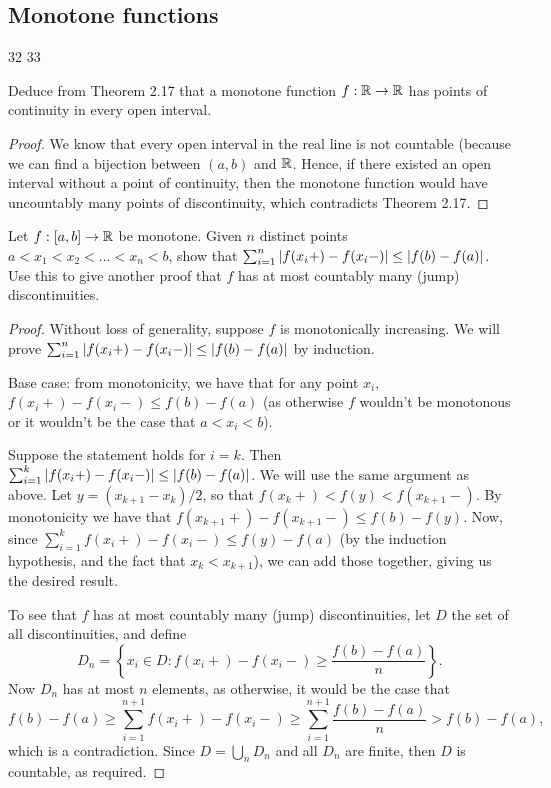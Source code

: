 \subsection{Monotone functions}

32
33

\begin{exercise}{32}
Deduce from Theorem 2.17 that a monotone function $f:\mathbb{R}\to\mathbb{R}$ has points of continuity in every open interval.
\end{exercise}
\begin{proof}
We know that every open interval in the real line is not countable (because we can find a bijection between $(a,b)$ and $\mathbb{R}$. Hence, if there existed an open interval without a point of continuity, then the monotone function would have uncountably many points of discontinuity, which contradicts Theorem 2.17.
\end{proof} 

\begin{exercise}{33}
Let $f:[a,b]\to\mathbb{R}$ be monotone. Given $n$ distinct points $a<x_1<x_2<\dots<x_n<b$, show that $\sum_{i=1}^n\left\lvert f(x_i+)-f(x_i-)\right\rvert\leq \left\lvert f(b)-f(a)\right\rvert$. Use this to give another proof that $f$ has at most countably many (jump) discontinuities.
\end{exercise}
\begin{proof}
Without loss of generality, suppose $f$ is monotonically increasing. We will prove $\sum_{i=1}^n\left\lvert f(x_i+)-f(x_i-)\right\rvert\leq \left\lvert f(b)-f(a)\right\rvert$ by induction.

Base case: from monotonicity, we have that for any point $x_i$, $f(x_i+)-f(x_i-)\leq f(b)-f(a)$ (as otherwise $f$ wouldn't be monotonous or it wouldn't be the case that $a<x_i<b$).

Suppose the statement holds for $i=k$. Then $\sum_{i=1}^k\left\lvert f(x_i+)-f(x_i-)\right\rvert\leq \left\lvert f(b)-f(a)\right\rvert$. We will use the same argument as above. Let $y=(x_{k+1}-x_k)/2$, so that $f(x_k+)<f(y)<f(x_{k+1}-)$. By monotonicity we have that $f(x_{k+1}+)-f(x_{k+1}-)\leq f(b)-f(y)$. Now, since $\sum_{i=1}^k f(x_i+)-f(x_i-)\leq f(y)-f(a)$ (by the induction hypothesis, and the fact that $x_k<x_{k+1}$), we can add those together, giving us the desired result.

To see that $f$ has at most countably many (jump) discontinuities, let $D$ the set of all discontinuities, and define
\[
    D_n=\left\{x_i\in D: f(x_i+)-f(x_i-)\geq\frac{f(b)-f(a)}{n}\right\}.
\]
Now $D_n$ has at most $n$ elements, as otherwise, it would be the case that 
\[
f(b)-f(a)\geq\sum_{i=1}^{n+1}f(x_i+)-f(x_i-) \geq\sum_{i=1}^{n+1}\frac{f(b)-f(a)}{n} > f(b)-f(a),
\]
which is a contradiction. Since $D=\bigcup_nD_n$ and all $D_n$ are finite, then $D$ is countable, as required.
\end{proof} 
